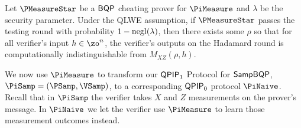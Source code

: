 \begin{lemma}
	\label{lem:urmila-binding}
	Let $\PMeasureStar$ be a $\operatorname{\mathsf{BQP}}$ cheating prover for $\PiMeasure$ and $\lambda$ be the security parameter. Under the QLWE assumption, if $\PMeasureStar$ passes the testing round with probability  $1-\negl(\lambda)$, then there exists some $\rho$ so that for all verifier's input $h \in \zo^n$, the verifier's outputs on the Hadamard round is computationally indistinguishable from $M_{XZ}(\rho, h)$.
	\iffalse    
	Suppose that for all $\lambda\in\bbN$ and $h\in\zo^*$ \Ethan{or $\zo^n$?},
	$\PMeasureStar$ passes the testing round with probability $1-\negl(\lambda)$.
	Then, under the QLWE assumption, there exists some $\rho$ so that for all $h$,
	The verifier's output on the Hadamard round is $\negl(\lambda)$-computationally indistinguishable from $M_{XZ}(\rho, h)$.
	\fi
\end{lemma}

We now use $\PiMeasure$ to transform our $\operatorname{\mathsf{QPIP}}_1$ Protocol for $\operatorname{\mathsf{SampBQP}}$, $\PiSamp=(\PSamp, \VSamp)$, to a corresponding $\operatorname{\mathsf{QPIP}}_0$ protocol $\PiNaive$.
Recall that in $\PiSamp$ the verifier takes $X$ and $Z$ measurements on the prover's message.
In $\PiNaive$ we let the verifier use $\PiMeasure$ to learn those measurement outcomes instead.

